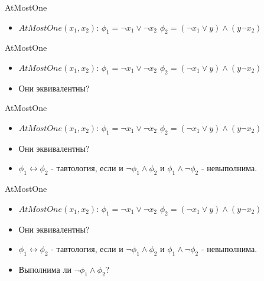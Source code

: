 \documentclass{beamer}
\begin{document}
\begin{frame}{AtMostOne}
\begin{itemize}
\item $AtMostOne(x_1, x_2)$:\newline
$\phi_1 = \lnot x_1 \vee \lnot x_2$\newline
$\phi_2 = (\lnot x_1 \vee y) \wedge (y \lnot x_2)$\newline
\end{itemize}
\end{frame}

\begin{frame}{AtMostOne}
\begin{itemize}
\item $AtMostOne(x_1, x_2)$:\newline
$\phi_1 = \lnot x_1 \vee \lnot x_2$\newline
$\phi_2 = (\lnot x_1 \vee y) \wedge (y \lnot x_2)$\newline
\item Они эквивалентны?
\end{itemize}
\end{frame}

\begin{frame}{AtMostOne}
\begin{itemize}
\item $AtMostOne(x_1, x_2)$:\newline
$\phi_1 = \lnot x_1 \vee \lnot x_2$\newline
$\phi_2 = (\lnot x_1 \vee y) \wedge (y \lnot x_2)$\newline
\item Они эквивалентны?
\item $\phi_1 \leftrightarrow \phi_2$ - тавтология, если и $\lnot \phi_1 \wedge \phi_2$ и $\phi_1 \wedge \lnot \phi_2$ -
невыполнима.
\end{itemize}
\end{frame}

\begin{frame}{AtMostOne}
\begin{itemize}
\item $AtMostOne(x_1, x_2)$:\newline
$\phi_1 = \lnot x_1 \vee \lnot x_2$\newline
$\phi_2 = (\lnot x_1 \vee y) \wedge (y \lnot x_2)$\newline
\item Они эквивалентны?
\item $\phi_1 \leftrightarrow \phi_2$ - тавтология, если и $\lnot \phi_1 \wedge \phi_2$ и $\phi_1 \wedge \lnot \phi_2$ -
невыполнима.
\item Выполнима ли $\lnot \phi_1 \wedge \phi_2$?
\end{itemize}
\end{frame}
\end{document}
